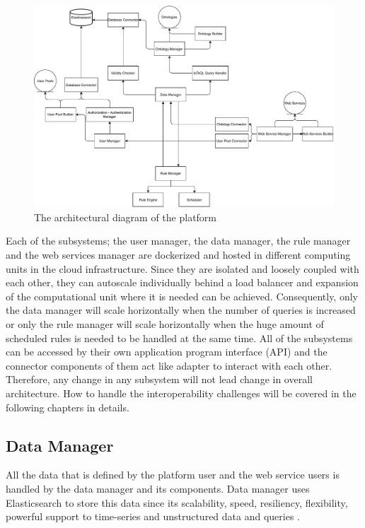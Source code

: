 \begin{figure}[h]
  \centering
  \includegraphics[width=\textwidth,height=\textheight,keepaspectratio]{figures/architectural_diagram.pdf}
  \caption[Platform Architecture]{The architectural diagram of the platform}\label{fig:architecture}
\end{figure}

Each of the subsystems; the user manager, the data manager, the rule manager and the web services manager are dockerized and hosted in different computing units in the cloud infrastructure. Since they are isolated and loosely coupled with each other, they can autoscale individually behind a load balancer and expansion of the computational unit where it is needed can be achieved. Consequently, only the data manager will scale horizontally when the number of queries is increased or only the rule manager will scale horizontally when the huge amount of scheduled rules is needed to be handled at the same time. All of the subsystems can be accessed by their own application program interface (API) and the connector components of them act like adapter to interact with each other. Therefore, any change in any subsystem will not lead change in overall architecture. How to handle the interoperability challenges will be covered in the following chapters in details.


\subsection{Data Manager}

All the data that is defined by the platform user and the web service users is handled by the data manager and its components. Data manager uses Elasticsearch to store this data since its scalability, speed, resiliency, flexibility, powerful support to time-series and unstructured data and queries \cite{elastic, elastic_time}.

